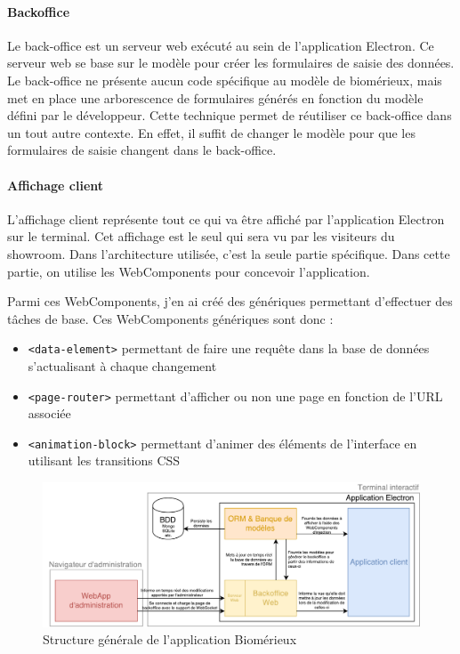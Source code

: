 \paragraph{Backoffice} Le back-office est un serveur web exécuté au sein de l'application Electron.
Ce serveur web se base sur le modèle pour créer les formulaires de saisie des données.
Le back-office ne présente aucun code spécifique au modèle de biomérieux, mais met en place une arborescence de formulaires générés en fonction du modèle défini par le développeur.
Cette technique permet de réutiliser ce back-office dans un tout autre contexte.
En effet, il suffit de changer le modèle pour que les formulaires de saisie changent dans le back-office.

\paragraph{Affichage client} L'affichage client représente tout ce qui va être affiché par l'application Electron sur le terminal.
Cet affichage est le seul qui sera vu par les visiteurs du showroom.
Dans l'architecture utilisée, c'est la seule partie spécifique.
Dans cette partie, on utilise les WebComponents pour concevoir l'application.

Parmi ces WebComponents, j'en ai créé des génériques permettant d'effectuer des tâches de base.
Ces WebComponents génériques sont donc :
\begin{itemize}
    \item \texttt{<data-element>} permettant de faire une requête dans la base de données s'actualisant à chaque changement
    \item \texttt{<page-router>} permettant d'afficher ou non une page en fonction de l'URL associée
    \item \texttt{<animation-block>} permettant d'animer des éléments de l'interface en utilisant les transitions CSS
\end{itemize}


\begin{figure}[h]
    \centering
    \includegraphics[scale=0.6]{img/Proposition-utopia.pdf}
    \caption{Structure générale de l'application Biomérieux}
\end{figure}